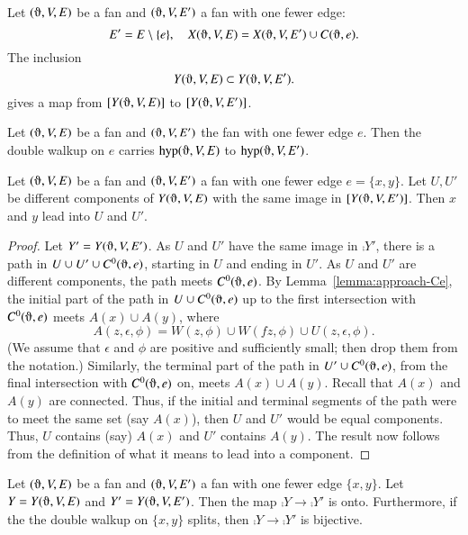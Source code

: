 \begin{lemma}
Let $(\orgn,V,E)$ be a fan and $(\orgn,V,E')$
a fan with one fewer edge:
  $$
  E' = E\setminus\{e\}, \quad X(\orgn,V,E) = X(\orgn,V,E')\cup C(\orgn,e).
  $$
The inclusion  $$Y(\orgn,V,E) \subset Y(\orgn,V,E').
   $$
gives a map
from $\comp{Y(\orgn,V,E)}$ to
$\comp{Y(\orgn,V,E')}$.
\end{lemma}

\begin{lemma}\label{lemma:pre-walkup}
Let $(\orgn,V,E)$ be a fan and $(\orgn,V,E')$
the fan with one fewer edge $e$.
Then the double walkup on $e$
carries $\op{hyp}(\orgn,V,E)$ to
$\op{hyp}(\orgn,V,E')$.
\end{lemma}

\begin{lemma}\label{lemma:join-comp}
Let $(\orgn,V,E)$ be a fan and $(\orgn,V,E')$
a fan with one fewer edge $e=\{x,y\}$.
Let $U,U'$ be different
components of $Y(\orgn,V,E)$ with the same
image in $\comp{Y(\orgn,V,E')}$.  Then 
$x$ and $y$ lead into $U$ and $U'$.
\end{lemma}

\begin{proof}  Let $Y'=Y(\orgn,V,E')$.
As $U$ and $U'$ have the same image in $\comp{Y'}$,
there is a path in $U\cup U'\cup C^0(\orgn,e)$, starting in $U$
and ending in $U'$.  As $U$ and $U'$ are different components,
the path meets $C^0(\orgn,e)$.
By Lemma~\ref{lemma:approach-Ce}, the
initial part of the path in $U\cup C^0(\orgn,e)$ up to the first
intersection with $C^0(\orgn,e)$ meets $A(x)\cup A(y)$, where
  $$
  A(z,\epsilon,\phi) = 
    W(z,\phi) \cup W(f z,\phi) 
  \cup U(z,\epsilon,\phi).
  $$
(We assume that $\epsilon$ and $\phi$ are positive and sufficiently
small; then drop them from the notation.)
Similarly, the terminal part of the path in $U'\cup C^0(\orgn,e)$, 
from the
final intersection with $C^0(\orgn,e)$ on, meets $A(x)\cup A(y)$.
Recall that $A(x)$ and $A(y)$ are connected.  Thus,
if the initial and terminal segments of the path were to
meet the
same set (say $A(x)$), then $U$ and $U'$ would be equal components.
Thus, $U$ contains (say) $A(x)$ and $U'$ contains $A(y)$.
The result now follows from the definition of what it means
to lead into a component.
\end{proof}


\begin{lemma}
Let $(\orgn,V,E)$ be a fan and $(\orgn,V,E')$
a fan with one fewer edge $\{x,y\}$.
Let $Y=Y(\orgn,V,E)$ and $Y'=Y(\orgn,V,E')$.
Then
the map  $\comp{Y}\to \comp{Y'}$ is onto.
Furthermore, if the the double walkup
on $\{x,y\}$ splits,
then $\comp{Y}\to\comp{Y'}$ is bijective.
\end{lemma}

